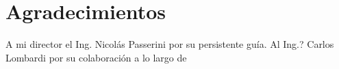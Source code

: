 
\section{Agradecimientos}

A mi director el Ing. Nicolás Passerini por su persistente guía. Al Ing.? 
Carlos Lombardi por su colaboración a lo largo de 
